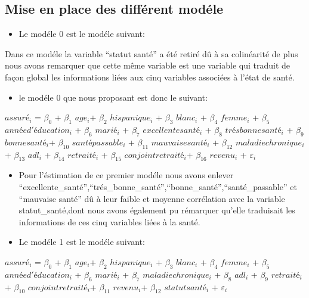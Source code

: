 \documentclass[
  14pt,
  french,
]{article}
\providecommand{\tightlist}{%
  \setlength{\itemsep}{0pt}\setlength{\parskip}{0pt}}
\begin{document}
\hypertarget{mise-en-place-des-diffuxe9rent-moduxe9le}{%
\subsection{Mise en place des différent
modéle}\label{mise-en-place-des-diffuxe9rent-moduxe9le}}

\begin{itemize}
\tightlist
\item
  Le modéle 0 est le modéle suivant:
\end{itemize}

Dans ce modéle la variable ``statut santé'' a été retiré dû à sa
colinéarité de plus nous avons remarquer que cette même variable est une
variable qui traduit de façon global les informations liées aux cinq
variables associées à l'état de santé.

\begin{itemize}
\tightlist
\item
  le modéle 0 que nous proposant est donc le suivant:
\end{itemize}

\begin{center}
$assuré_i$ = $\beta_0$  + $\beta_1$ $age_i$+ $\beta_2$ $hispanique_i$ + $\beta_3$ $blanc_i$ + $\beta_4$ $femme_i$  + $\beta_{5}$ $année d'éducation_i$ + $\beta_{6}$ $marié_i$ + $\beta_{7}$ $excellente santé_i$ +  $\beta_8$ $trés bonne santé_i$  + $\beta_9$ $bonne santé_i$+ $\beta_10$ $santé passable_i$ + $\beta_11$ $mauvaise santé_i$ + $\beta_12$ $maladie chronique_i$  + $\beta_{13}$ $adl_i$ + $\beta_{14}$ $retraité_i$ + $\beta_{15}$ $conjoint retraité_i$+ $\beta_{16}$ $revenu_i$ + $\varepsilon_i$ 
\end{center}

\begin{itemize}
\item
  Pour l'éstimation de ce premier modéle nous avons enlever
  ``excellente\_santé'',``trés\_bonne\_santé'',``bonne\_santé'',``santé\_passable''
  et ``mauvaise santé'' dû à leur faible et moyenne corrélation avec la
  variable statut\_santé,dont nous avons également pu rémarquer qu'elle
  traduisait les informations de ces cinq variables liées à la santé.
\item
  Le modéle 1 est le modéle suivant:
\end{itemize}

\begin{center}
$assuré_i$ = $\beta_0$  + $\beta_1$ $age_i$+ $\beta_2$ $hispanique_i$ + $\beta_3$ $blanc_i$ + $\beta_4$ $femme_i$  + $\beta_{5}$ $année d'éducation_i$ + $\beta_{6}$ $marié_i$ + $\beta_7$ $maladie chronique_i$  + $\beta_{8}$ $adl_i$ + $\beta_{9}$ $retraité_i$ + $\beta_{10}$ $conjoint retraité_i$+ $\beta_{11}$ $revenu_i$+ $\beta_{12}$ $statut santé_i$ + $\varepsilon_i$ 
\end{center}
\end{document}
